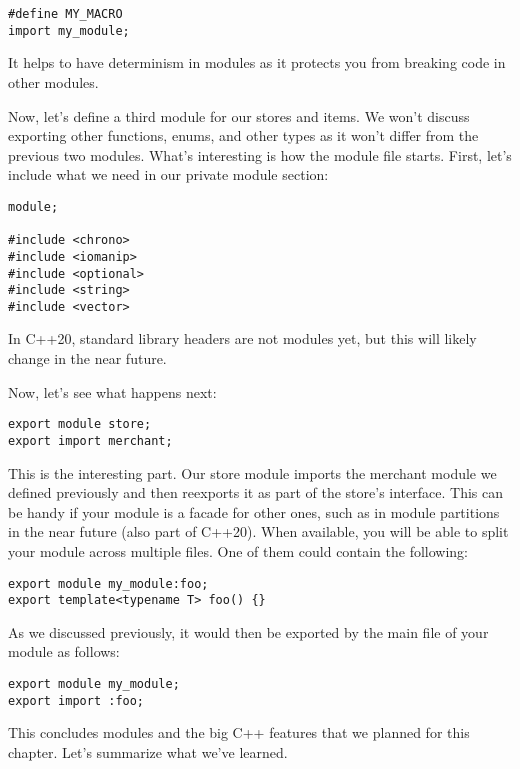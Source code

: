 \begin{lstlisting}[style=styleCXX]
#define MY_MACRO
import my_module;
\end{lstlisting}

It helps to have determinism in modules as it protects you from breaking code in other modules.

Now, let's define a third module for our stores and items. We won't discuss exporting other functions, enums, and other types as it won't differ from the previous two modules. What's interesting is how the module file starts. First, let's include what we need in our private module section:

\begin{lstlisting}[style=styleCXX]
module;

#include <chrono>
#include <iomanip>
#include <optional>
#include <string>
#include <vector>
\end{lstlisting}

In C++20, standard library headers are not modules yet, but this will likely change in the near future.

Now, let's see what happens next:

\begin{lstlisting}[style=styleCXX]
export module store;
export import merchant;
\end{lstlisting}

This is the interesting part. Our store module imports the merchant module we defined previously and then reexports it as part of the store's interface. This can be handy if your module is a facade for other ones, such as in module partitions in the near future (also part of C++20). When available, you will be able to split your module across multiple files. One of them could contain the following:

\begin{lstlisting}[style=styleCXX]
export module my_module:foo;
export template<typename T> foo() {}
\end{lstlisting}

As we discussed previously, it would then be exported by the main file of your module as follows:

\begin{lstlisting}[style=styleCXX]
export module my_module;
export import :foo;
\end{lstlisting}

This concludes modules and the big C++ features that we planned for this chapter. Let's summarize what we've learned.






